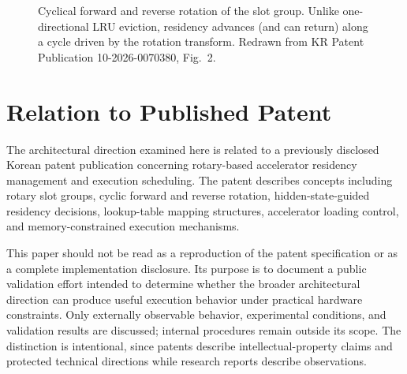 \documentclass[11pt]{article}
\begin{document}
\begin{figure}[t]
\centering
{}
\caption{Cyclical forward and reverse rotation of the slot group. Unlike one-directional LRU eviction, residency advances (and can return) along a cycle driven by the rotation transform. Redrawn from KR Patent Publication 10-2026-0070380, Fig.~2.}
\label{fig:rotation}
\end{figure}

\section{Relation to Published Patent}

The architectural direction examined here is related to a previously disclosed Korean patent publication concerning rotary-based accelerator residency management and execution scheduling. The patent describes concepts including rotary slot groups, cyclic forward and reverse rotation, hidden-state-guided residency decisions, lookup-table mapping structures, accelerator loading control, and memory-constrained execution mechanisms.

This paper should not be read as a reproduction of the patent specification or as a complete implementation disclosure. Its purpose is to document a public validation effort intended to determine whether the broader architectural direction can produce useful execution behavior under practical hardware constraints. Only externally observable behavior, experimental conditions, and validation results are discussed; internal procedures remain outside its scope. The distinction is intentional, since patents describe intellectual-property claims and protected technical directions while research reports describe observations.
\end{document}
